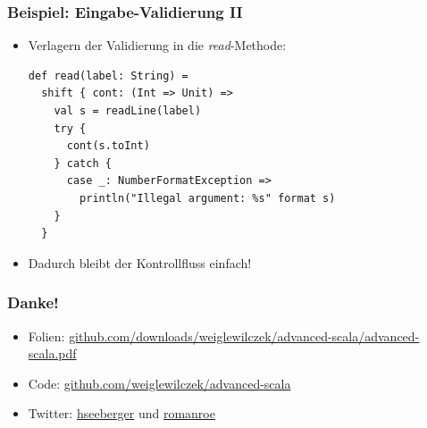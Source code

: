 \documentclass{beamer}
\begin{document}
\begin{frame}[fragile]
  \frametitle{Beispiel: Eingabe-Validierung II}
  \begin{itemize}
    \item Verlagern der Validierung in die \emph{read}-Methode:
    \begin{lstlisting}
def read(label: String) =
  shift { cont: (Int => Unit) =>
    val s = readLine(label)
    try {
      cont(s.toInt)
    } catch {
      case _: NumberFormatException =>
        println("Illegal argument: %s" format s)
    }
  }
    \end{lstlisting}
    \item Dadurch bleibt der Kontrollfluss einfach!
  \end{itemize}
\end{frame}




\begin{frame}
  \frametitle{Danke!}
  \begin{itemize}
    \item Folien: \href{https://github.com/downloads/weiglewilczek/advanced-scala/advanced-scala.pdf}{github.com/downloads/weiglewilczek/advanced-scala/advanced-scala.pdf}
    \item Code: \href{https://github.com/weiglewilczek/advanced-scala}{github.com/weiglewilczek/advanced-scala}
    \item Twitter: \href{http://twitter.com/hseeberger}{hseeberger} und \href{http://twitter.com/romanroe}{romanroe}
  \end{itemize}
\end{frame}
\end{document}

